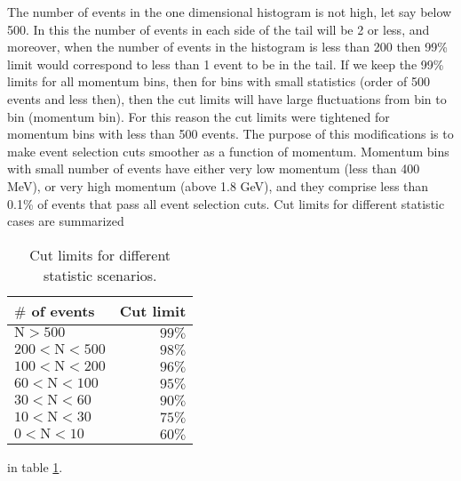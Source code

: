 \documentclass[letterpaper,12pt]{article}
\begin{document}

\vskip 1cm
The number of events in the one dimensional histogram is not high, let say below 
500. In this the number of events in each side of the tail will be 2 or less, and 
moreover, when the number of events in the histogram is less than 200 then 99\%
limit would correspond to less than 1 event to be in the tail. If we keep the 99\%
limits for all momentum bins, then for bins with small statistics 
(order of 500 events and less then), then the cut limits will have large
fluctuations from bin to bin (momentum bin). For this reason the cut limits
were tightened for momentum bins with less than 500 events. The purpose of this
modifications is to make event selection cuts smoother as a function of momentum.
Momentum bins with small number of events have either very low momentum 
(less than 400 MeV), or very high momentum (above 1.8 GeV), and they comprise
less than 0.1\% of events that pass all event selection cuts.
Cut limits for different statistic cases are summarized
\begin{table}[!htb]
 \centering
 \begin{tabular}{|l|r|}
  \hline
 \textbf{ $\#$ of events} & \textbf{Cut limit} \\ \hline
  $\mathrm{ N > 500}$ & $99\%$ \\ \hline
  $\mathrm{200 < N < 500}$ & $98\%$ \\ \hline
  $\mathrm{100 < N < 200}$ & $96\%$ \\ \hline
  $\mathrm{60 < N < 100}$ & $95\%$ \\ \hline
  $\mathrm{30 < N < 60}$ & $90\%$ \\ \hline
  $\mathrm{10 < N < 30}$ & $75\%$ \\ \hline
  $\mathrm{0  < N < 10}$ & $60\%$ \\ \hline
 \end{tabular}
\caption{Cut limits for different statistic scenarios.}
\label{tb:2DCutLimits}
\end{table}
in table \ref{tb:2DCutLimits}.
\end{document}
